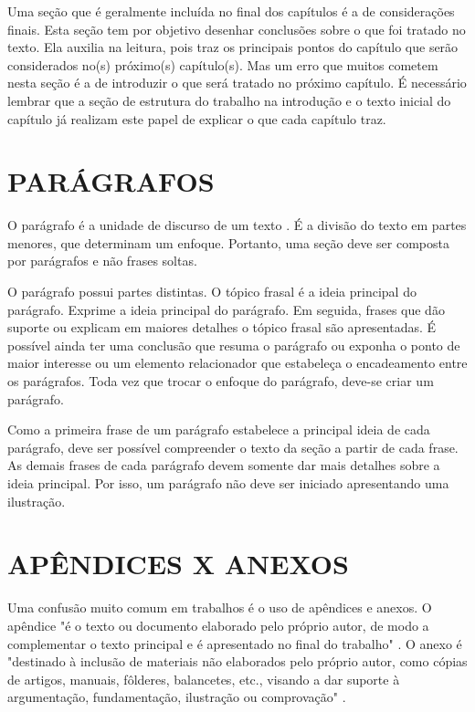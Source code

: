 Uma seção que é geralmente incluída no final dos capítulos é a de considerações finais. Esta seção tem por objetivo desenhar conclusões sobre o que foi tratado no texto. Ela auxilia na leitura, pois traz os principais pontos do capítulo que serão considerados no(s) próximo(s) capítulo(s). Mas um erro que muitos cometem nesta seção é a de introduzir o que será tratado no próximo capítulo. É necessário lembrar que a seção de estrutura do trabalho na introdução e o texto inicial do capítulo já realizam este papel de explicar o que cada capítulo traz. 

\section{PARÁGRAFOS}

O parágrafo é a unidade de discurso de um texto \cite{martins2019}. É a divisão do texto em partes menores, que determinam um enfoque. Portanto, uma seção deve ser composta por parágrafos e não frases soltas. 

O parágrafo possui partes distintas\cite{martins2019}. O tópico frasal é a ideia principal do parágrafo. Exprime a ideia principal do parágrafo. Em seguida, frases que dão suporte ou explicam em maiores detalhes o tópico frasal são apresentadas. É possível ainda ter uma conclusão que resuma o parágrafo ou exponha o ponto de maior interesse ou um elemento relacionador que estabeleça o encadeamento entre os parágrafos. Toda vez que trocar o enfoque do parágrafo, deve-se criar um parágrafo. 

Como a primeira frase de um parágrafo estabelece a principal ideia de cada parágrafo, deve ser possível compreender o texto da seção a partir de cada frase. As demais frases de cada parágrafo devem somente dar mais detalhes sobre a ideia principal. Por isso, um parágrafo não deve ser iniciado apresentando uma ilustração.  

\section{APÊNDICES X ANEXOS}

Uma confusão muito comum em trabalhos é o uso de apêndices e anexos. O apêndice "é o texto ou documento elaborado pelo próprio autor, de modo a complementar o texto principal e é apresentado no final do trabalho" \cite{guiaUCS}. O anexo é "destinado à inclusão de materiais não 
elaborados pelo próprio autor, como cópias de artigos, manuais, fôlderes, balancetes, etc., visando a dar suporte à argumentação, fundamentação, ilustração ou comprovação" \cite{guiaUCS}. 

